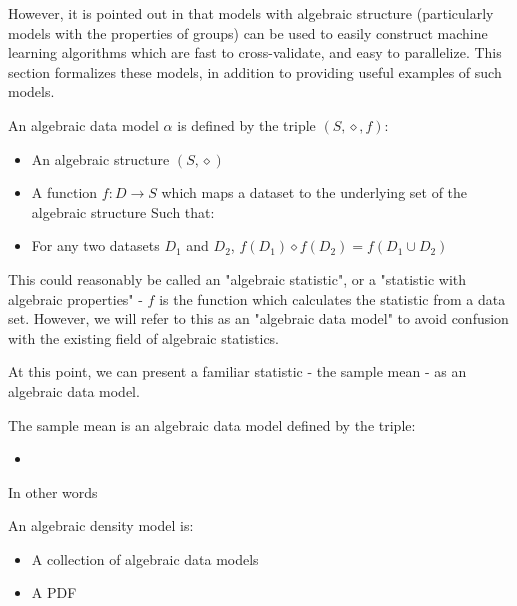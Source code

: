 \documentclass{article}
\begin{document}
However, it is pointed out in \cite{algebraic classifiers} that models with algebraic structure (particularly models with the properties of groups) can be used to easily construct machine learning algorithms which are fast to cross-validate, and easy to parallelize. This section formalizes these models, in addition to providing useful examples of such models.

\begin{mydef}
An algebraic data model $\alpha$ is defined by the triple $(S, \diamond, f)$: 
\begin{itemize}  
    \item An algebraic structure $(S, \diamond)$
    \item A function $f:D \rightarrow S$ which maps a dataset to the underlying set of the algebraic structure
	\linebreak 	\linebreak    
    Such that:
    
    \item For any two datasets $D_1$ and $D_2$, $f(D_1) \diamond f(D_2) = f(D_1 \cup D_2)$ 
    
\end{itemize}
\end{mydef}

This could reasonably be called an "algebraic statistic", or a "statistic with algebraic properties" - $f$ is the function which calculates the statistic from a data set. However, we will refer to this as an "algebraic data model" to avoid confusion with the existing field of algebraic statistics.

At this point, we can present a familiar statistic - the sample mean - as an algebraic data model.

\begin{mydef}
The sample mean is an algebraic data model defined by the triple:
\begin{itemize}
	\item 
\end{itemize}
\end{mydef}

In other words

\begin{mydef}
An algebraic density model is:
\begin{itemize}  
    \item A collection of algebraic data models
    \item A PDF
\end{itemize}
\end{mydef}
\end{document}

